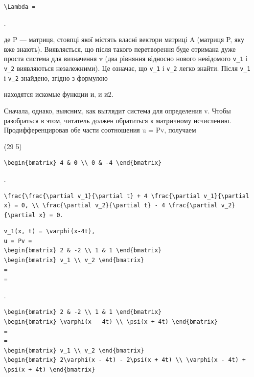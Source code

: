 \documentclass[
  ukrainian,
]{article}
\begin{document}
\begin{verbatim}
\Lambda =
\end{verbatim}

.

де P --- матриця, стовпці якої містять власні вектори матриці A (матриця
P, яку вже знають). Виявляється, що після такого перетворення буде
отримана дуже проста система для визначення v (два рівняння відносно
нового невідомого \texttt{v\_1} і \texttt{v\_2} виявляються
незалежними). Це означає, що \texttt{v\_1} і \texttt{v\_2} легко знайти.
Після \texttt{v\_1} і \texttt{v\_2} знайдено, згідно з формулою

находятся искомые функции и, и и2.

Сначала, однако, выясним, как выглядит система для определения v. Чтобы
разобраться в этом, читатель должен обратиться к матричному исчислению.
Продифференцировав обе части соотношения u = Pv, получаем

(29 5)

\begin{verbatim}
\begin{bmatrix} 4 & 0 \\ 0 & -4 \end{bmatrix}
\end{verbatim}

.

\begin{verbatim}
\frac{\frac{\partial v_1}{\partial t} + 4 \frac{\partial v_1}{\partial x} = 0, \\ \frac{\partial v_2}{\partial t} - 4 \frac{\partial v_2}{\partial x} = 0.
\end{verbatim}

\begin{verbatim}
v_1(x, t) = \varphi(x-4t),
u = Pv =
\begin{bmatrix} 2 & -2 \\ 1 & 1 \end{bmatrix}
\begin{bmatrix} v_1 \\ v_2 \end{bmatrix}
=
=
\end{verbatim}

.

\begin{verbatim}
\begin{bmatrix} 2 & -2 \\ 1 & 1 \end{bmatrix}
\begin{bmatrix} \varphi(x - 4t) \\ \psi(x + 4t) \end{bmatrix}
=
=
\begin{bmatrix} v_1 \\ v_2 \end{bmatrix}
\begin{bmatrix} 2\varphi(x - 4t) - 2\psi(x + 4t) \\ \varphi(x - 4t) + \psi(x + 4t) \end{bmatrix}
\end{verbatim}
\end{document}
